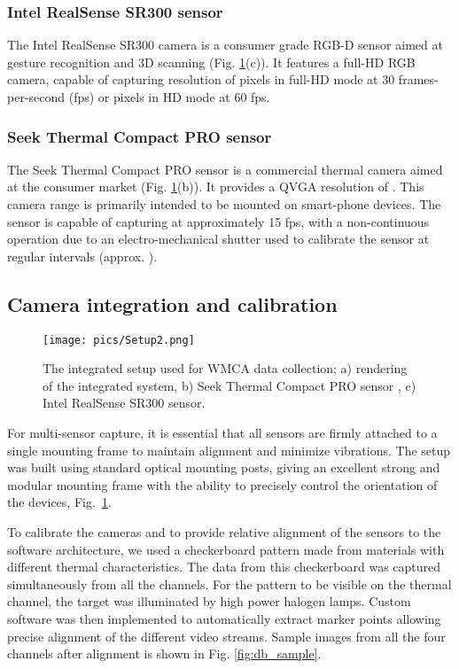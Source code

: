 \documentclass[journal]{IEEEtran}
\begin{document}
\subsubsection{Intel RealSense SR300 sensor}


The Intel RealSense SR300 camera is a consumer grade RGB-D sensor aimed at gesture recognition and 3D scanning (Fig.  \ref{fig:idiap_setup}(c)). It features a full-HD RGB camera, capable of capturing resolution of  pixels in full-HD mode at 30 frames-per-second (fps) or  pixels in HD mode at 60 fps. 

\subsubsection{Seek Thermal Compact PRO sensor}

The Seek Thermal Compact PRO sensor is a commercial thermal camera aimed at the consumer market (Fig. \ref{fig:idiap_setup}(b)). It provides a QVGA resolution of . This camera range is primarily intended to be mounted on smart-phone devices. The sensor is capable of capturing at approximately 15 fps, with a non-continuous operation due to an electro-mechanical shutter used to calibrate the sensor at regular intervals (approx. ).

\subsection{Camera integration and calibration}

\begin{figure}[h]
    \begin{center}
        \texttt{[image: pics/Setup2.png]}
        \caption{The integrated setup used for WMCA data collection; a) rendering of the integrated system, b) Seek Thermal Compact PRO sensor , c) Intel RealSense SR300 sensor. }\label{fig:idiap_setup}
    \end{center}
\end{figure}


For multi-sensor capture, it is essential that all sensors are firmly attached to a single mounting frame to maintain alignment and minimize vibrations. The setup was built using standard optical mounting posts,  giving an excellent strong and modular mounting frame with the ability to precisely control the orientation of the devices, Fig.~\ref{fig:idiap_setup}.

To calibrate the cameras and to provide relative alignment of the sensors to the software architecture, we used a checkerboard pattern made from materials with different thermal characteristics. The data from this checkerboard was captured simultaneously from all the channels. For the pattern to be visible on the thermal channel, the target was illuminated by high power halogen lamps. Custom software was then implemented to automatically extract marker points allowing precise alignment of the different video streams. Sample images from all the four channels after alignment is shown in Fig. \ref{fig:db_sample}.
\end{document}
